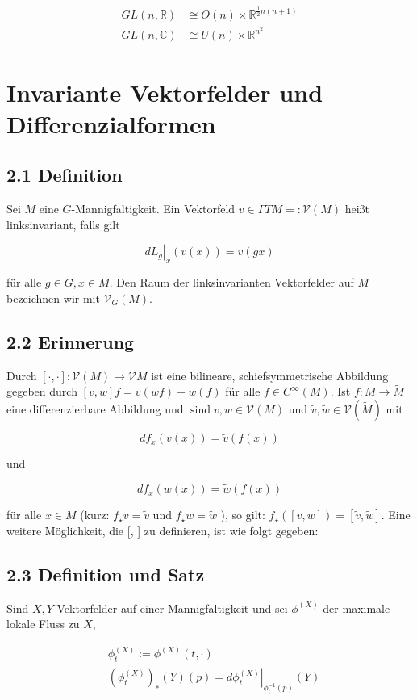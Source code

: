 \documentclass[10pt, letterpaper]{article}
\begin{document}
$$
\begin{aligned}
G L(n, \mathbb{R}) & \cong O(n) \times \mathbb{R}^{\frac{1}{2} n(n+1)} \\
G L(n, \mathbb{C}) & \cong U(n) \times \mathbb{R}^{n^{2}}
\end{aligned}
$$


\pagebreak

\section{Invariante Vektorfelder und Differenzialformen}
\subsection*{2.1 Definition}
Sei $M$ eine $G$-Mannigfaltigkeit. Ein Vektorfeld $v \in \Gamma T M=: \mathcal{V}(M)$ heißt linksinvariant, falls gilt

$$
\left.d L_{g}\right|_{x}(v(x))=v(g x)
$$

für alle $g \in G, x \in M$. Den Raum der linksinvarianten Vektorfelder auf $M$ bezeichnen wir mit $\mathcal{V}_{G}(M)$.

\subsection*{2.2 Erinnerung}
Durch $[\cdot, \cdot]: \mathcal{V}(M) \rightarrow \mathcal{V} M$ ist eine bilineare, schiefsymmetrische Abbildung gegeben durch $[v, w] f=v(w f)-w(f)$ für alle $f \in C^{\infty}(M)$. Ist $f: M \rightarrow \widetilde{M}$ eine differenzierbare Abbildung und $\operatorname{sind} v, w \in \mathcal{V}(M)$ und $\tilde{v}, \tilde{w} \in \mathcal{V}(\widetilde{M})$ mit

$$
d f_{x}(v(x))=\tilde{v}(f(x))
$$

und

$$
d f_{x}(w(x))=\tilde{w}(f(x))
$$

für alle $x \in M$ (kurz: $f_{\star} v=\tilde{v}$ und $f_{\star} w=\tilde{w}$ ), so gilt: $f_{\star}([v, w])=[\tilde{v}, \tilde{w}]$. Eine weitere Möglichkeit, die [, ] zu definieren, ist wie folgt gegeben:

\subsection*{2.3 Definition und Satz}
Sind $X, Y$ Vektorfelder auf einer Mannigfaltigkeit und sei $\phi^{(X)}$ der maximale lokale Fluss zu $X$,

$$
\begin{aligned}
& \phi_{t}^{(X)}:=\phi^{(X)}(t, \cdot) \\
& \left(\phi_{t}^{(X)}\right)_{*}(Y)(p)=\left.d \phi_{t}^{(X)}\right|_{\phi_{t}^{-1}(p)}(Y)
\end{aligned}
$$
\end{document}
